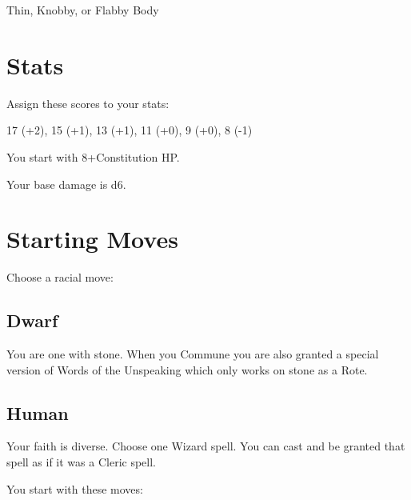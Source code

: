 Thin, Knobby, or Flabby Body

       

       
\section{Stats}   
       

         

Assign these scores to your stats:

 		 		         

17 (+2), 15 (+1), 13 (+1), 11 (+0), 9 (+0), 8 (-1)

         

You start with 8+Constitution HP.

       

       

Your base damage is d6.

       
\section{Starting Moves}   
       

         
\startInstructionsAfterHeader
Choose a racial move:
\stopInstructionsAfterHeader
         

           
\subsection{Dwarf}   
           

You are one with stone. When you Commune you are also granted a special version of Words of the Unspeaking which only works on stone as a Rote.

           
\subsection{Human}   
           

Your faith is diverse. Choose one Wizard spell. You can cast and be granted that spell as if it was a Cleric spell.

         

         

           
\startInstructions
You start with these moves:
\stopInstructions
           

